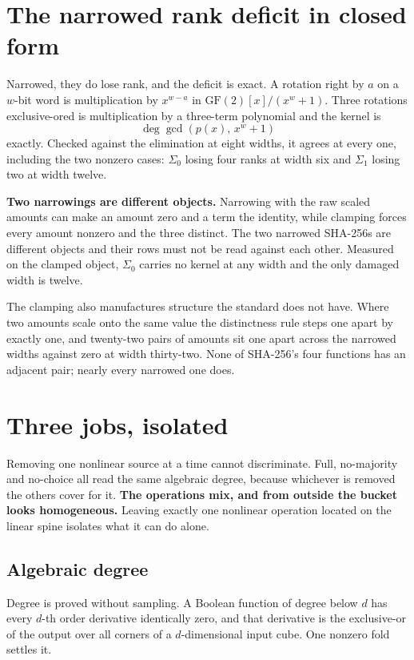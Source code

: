 \section{The narrowed rank deficit in closed form}

Narrowed, they do lose rank, and the deficit is exact. A rotation right by \(a\) on a \(w\)-bit word is multiplication by \(x^{w-a}\) in \(\mathrm{GF}(2)[x]/(x^w + 1)\). Three rotations exclusive-ored is multiplication by a three-term polynomial and the kernel is
\[
  \deg \gcd\!\left(p(x),\, x^w + 1\right)
\]
exactly. Checked against the elimination at eight widths, it agrees at every one, including the two nonzero cases: \(\Sigma_0\) losing four ranks at width six and \(\Sigma_1\) losing two at width twelve.

\textbf{Two narrowings are different objects.} Narrowing with the raw scaled amounts can make an amount zero and a term the identity, while clamping forces every amount nonzero and the three distinct. The two narrowed SHA-256s are different objects and their rows must not be read against each other. Measured on the clamped object, \(\Sigma_0\) carries no kernel at any width and the only damaged width is twelve.

The clamping also manufactures structure the standard does not have. Where two amounts scale onto the same value the distinctness rule steps one apart by exactly one, and twenty-two pairs of amounts sit one apart across the narrowed widths against zero at width thirty-two. None of SHA-256's four functions has an adjacent pair; nearly every narrowed one does.

\section{Three jobs, isolated}

Removing one nonlinear source at a time cannot discriminate. Full, no-majority and no-choice all read the same algebraic degree, because whichever is removed the others cover for it. \textbf{The operations mix, and from outside the bucket looks homogeneous.} Leaving exactly one nonlinear operation located on the linear spine isolates what it can do alone.

\subsection{Algebraic degree}

Degree is proved without sampling. A Boolean function of degree below \(d\) has every \(d\)-th order derivative identically zero, and that derivative is the exclusive-or of the output over all corners of a \(d\)-dimensional input cube. One nonzero fold settles it.

